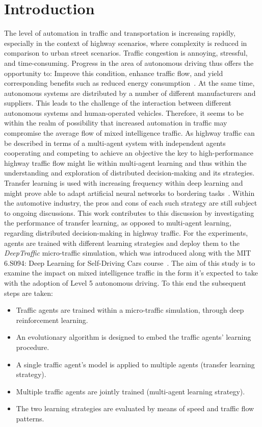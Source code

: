 \documentclass{article}
\begin{document}
\section{Introduction}
The level of automation in traffic and transportation is increasing rapidly,  especially in the context of highway scenarios, where complexity is reduced in comparison to urban street scenarios. Traffic congestion is annoying, stressful, and time-consuming. Progress in the area of autonomous driving thus offers the opportunity to: Improve this condition, enhance traffic flow, and yield corresponding benefits such as reduced energy consumption~\cite{WINNER.2015}. At the same time, autonomous systems are distributed by a number of different manufacturers and suppliers. This leads to the challenge of the interaction between different autonomous systems and human-operated vehicles. Therefore, it seems to be within the realm of possibility that increased automation in traffic may compromise the average flow of mixed intelligence traffic. As highway traffic can be described in terms of a multi-agent system with independent agents cooperating and competing to achieve an objective the key to high-performance highway traffic flow might lie within multi-agent learning and thus within the understanding and exploration of distributed decision-making and its strategies. Transfer learning is used with increasing frequency within deep learning and might prove able to adapt artificial neural networks to bordering tasks~\cite{IAI.2018}. Within the automotive industry, the pros and cons of each such strategy are still subject to ongoing discussions. This work contributes to this discussion by investigating the performance of transfer learning, as opposed to multi-agent learning, regarding distributed decision-making in highway traffic. For the experiments, agents are trained with different learning strategies and deploy them to the \emph{DeepTraffic} micro-traffic simulation, which was introduced along with the MIT 6.S094: Deep Learning for Self-Driving Cars course~\cite{FRIDMAN.2018}.  The aim of this study is to examine the impact on mixed intelligence traffic in the form it's expected to take with the adoption of Level 5 autonomous driving. To this end the subsequent steps are taken:
\begin{itemize}
	\item Traffic agents are trained within a micro-traffic simulation, through deep reinforcement learning. 
	\item An evolutionary algorithm is designed to embed the traffic agents' learning procedure.
	\item A single traffic agent's model is applied to multiple agents (transfer learning strategy).
	\item Multiple traffic agents are jointly trained (multi-agent learning strategy).
	\item The two learning strategies are evaluated by means of speed and traffic flow patterns.
\end{itemize}
\end{document}
